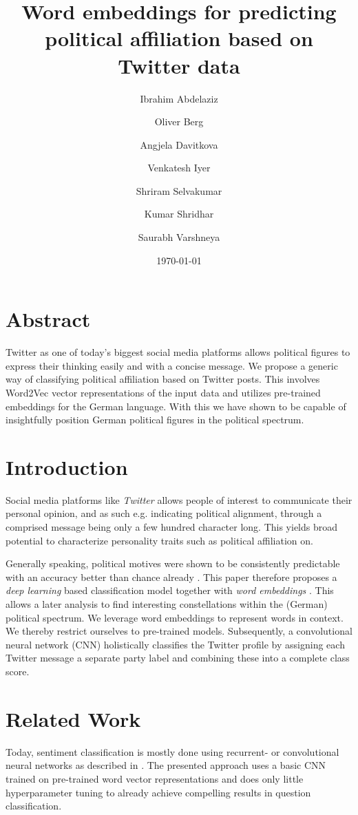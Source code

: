 \documentclass[10pt, oneside]{article}
\title{Word embeddings for predicting political affiliation based on Twitter data}
\author[]{Ibrahim Abdelaziz}
\author[]{Oliver Berg}
\author[]{Angjela Davitkova}
\author[]{Venkatesh Iyer}
\author[]{Shriram Selvakumar}
\author[]{Kumar Shridhar}
\author[]{Saurabh Varshneya}
\affil[1]{Technische Universität Kaiserslautern}
\date{\today}
\begin{document}
\maketitle
\begin{multicols}{2}


\section{Abstract}

Twitter as one of today's biggest social media platforms allows political figures to express their thinking easily and with a concise message. We propose a generic way of classifying political affiliation based on Twitter posts. This involves Word2Vec vector representations of the input data and utilizes pre-trained embeddings for the German language. With this we have shown to be capable of insightfully position German political figures in the political spectrum. 


\section{Introduction}

Social media platforms like \emph{Twitter} allows people of interest to communicate their personal opinion, and as such e.g. indicating political alignment, through a comprised message being only a few hundred character long. This yields broad potential to characterize personality traits such as political affiliation on.

Generally speaking, political motives were shown to be consistently predictable with an accuracy better than chance already \cite{Biessmann2017}.
This paper therefore proposes a \emph{deep learning} based classification model together with \emph{word embeddings} \cite{Pelevinala2016}. This allows a later analysis to find interesting constellations within the (German) political spectrum.
We leverage word embeddings to represent words in context. We thereby restrict ourselves to pre-trained models. Subsequently, a convolutional neural network (CNN) holistically classifies the Twitter profile by assigning each Twitter message a separate party label and combining these into a complete class score.


\section{Related Work}

Today, sentiment classification is mostly done using recurrent- or convolutional neural networks as described in \cite{Kim2014}. The presented approach uses a basic CNN trained on pre-trained word vector representations and does only little hyperparameter tuning to already achieve compelling results in question classification.


\end{multicols}
\end{document}
